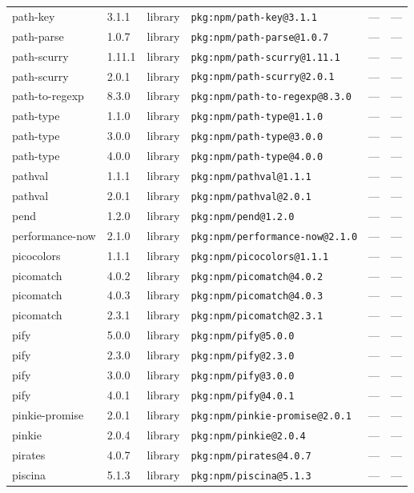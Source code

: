 \documentclass[11pt]{article}
\begin{document}
\begin{longtable}{|l|l|l|p{2.2cm}|l|p{4cm}|}
path-key & 3.1.1 & library & \texttt{pkg:npm/path-key@3.1.1} & — & — \\
path-parse & 1.0.7 & library & \texttt{pkg:npm/path-parse@1.0.7} & — & — \\
path-scurry & 1.11.1 & library & \texttt{pkg:npm/path-scurry@1.11.1} & — & — \\
path-scurry & 2.0.1 & library & \texttt{pkg:npm/path-scurry@2.0.1} & — & — \\
path-to-regexp & 8.3.0 & library & \texttt{pkg:npm/path-to-regexp@8.3.0} & — & — \\
path-type & 1.1.0 & library & \texttt{pkg:npm/path-type@1.1.0} & — & — \\
path-type & 3.0.0 & library & \texttt{pkg:npm/path-type@3.0.0} & — & — \\
path-type & 4.0.0 & library & \texttt{pkg:npm/path-type@4.0.0} & — & — \\
pathval & 1.1.1 & library & \texttt{pkg:npm/pathval@1.1.1} & — & — \\
pathval & 2.0.1 & library & \texttt{pkg:npm/pathval@2.0.1} & — & — \\
pend & 1.2.0 & library & \texttt{pkg:npm/pend@1.2.0} & — & — \\
performance-now & 2.1.0 & library & \texttt{pkg:npm/performance-now@2.1.0} & — & — \\
picocolors & 1.1.1 & library & \texttt{pkg:npm/picocolors@1.1.1} & — & — \\
picomatch & 4.0.2 & library & \texttt{pkg:npm/picomatch@4.0.2} & — & — \\
picomatch & 4.0.3 & library & \texttt{pkg:npm/picomatch@4.0.3} & — & — \\
picomatch & 2.3.1 & library & \texttt{pkg:npm/picomatch@2.3.1} & — & — \\
pify & 5.0.0 & library & \texttt{pkg:npm/pify@5.0.0} & — & — \\
pify & 2.3.0 & library & \texttt{pkg:npm/pify@2.3.0} & — & — \\
pify & 3.0.0 & library & \texttt{pkg:npm/pify@3.0.0} & — & — \\
pify & 4.0.1 & library & \texttt{pkg:npm/pify@4.0.1} & — & — \\
pinkie-promise & 2.0.1 & library & \texttt{pkg:npm/pinkie-promise@2.0.1} & — & — \\
pinkie & 2.0.4 & library & \texttt{pkg:npm/pinkie@2.0.4} & — & — \\
pirates & 4.0.7 & library & \texttt{pkg:npm/pirates@4.0.7} & — & — \\
piscina & 5.1.3 & library & \texttt{pkg:npm/piscina@5.1.3} & — & — \\

\end{longtable}
\end{document}
